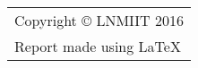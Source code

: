 \thispagestyle{empty}
\small
\strut\vfill \begin{tabular}{@{}p{\textwidth}@{}}
	\midrule	
	\noindent Copyright \copyright{} LNMIIT 2016\\
	Report made using \LaTeX\\
	\end{tabular}
\clearpage

